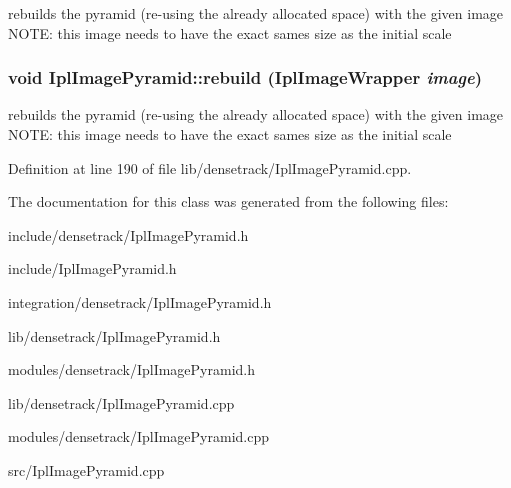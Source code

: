 rebuilds the pyramid (re-\/using the already allocated space) with the given image NOTE: this image needs to have the exact sames size as the initial scale \hypertarget{class_ipl_image_pyramid_a24f697b2da922a8240aa9f24af476d5e}{
\subsubsection[{rebuild}]{\setlength{\rightskip}{0pt plus 5cm}void IplImagePyramid::rebuild ({\bf IplImageWrapper} {\em image})}}
\label{class_ipl_image_pyramid_a24f697b2da922a8240aa9f24af476d5e}
rebuilds the pyramid (re-\/using the already allocated space) with the given image NOTE: this image needs to have the exact sames size as the initial scale 

Definition at line 190 of file lib/densetrack/IplImagePyramid.cpp.



The documentation for this class was generated from the following files:\begin{DoxyCompactItemize}
\item 
include/densetrack/IplImagePyramid.h\item 
include/IplImagePyramid.h\item 
integration/densetrack/IplImagePyramid.h\item 
lib/densetrack/IplImagePyramid.h\item 
modules/densetrack/IplImagePyramid.h\item 
lib/densetrack/IplImagePyramid.cpp\item 
modules/densetrack/IplImagePyramid.cpp\item 
src/IplImagePyramid.cpp\end{DoxyCompactItemize}
